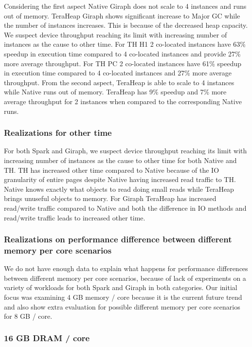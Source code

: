 Considering the first aspect Native Giraph does not scale to 4 instances and runs out of memory. TeraHeap Giraph shows significant increase to Major GC while the number of instances increases. This is because of the decreased heap capacity. We suspect device throughput reaching its limit with increasing number of instances as the cause to other time. For TH H1 2 co-located instances have 63\% speedup in execution time compared to 4 co-located instances and provide 27\% more average throughput. For TH PC 2 co-located instances have 61\% speedup in execution time compared to 4 co-located instances and 27\% more average throughput. From the second aspect, TeraHeap is able to scale to 4 instances while Native runs out of memory. TeraHeap has 9\% speedup and 7\% more average throughput for 2 instances when compared to the corresponding Native runs.

\subsubsection{Realizations for other time}
For both Spark and Giraph, we suspect device throughput reaching its limit with increasing number of instances as the cause to other time for both Native and TH. TH has increased other time compared to Native because of the IO granularity of entire pages despite Native having increased read traffic to TH. Native knows exactly what objects to read doing small reads while TeraHeap brings unuseful objects to memory. For Giraph TeraHeap has increased read/write traffic compared to Native and both the difference in IO methods and read/write traffic leads to increased other time.

\subsubsection{Realizations on performance difference between different memory per core scenarios}
We do not have enough data to explain what happens for performance differences between different memory per core scenarios, because of lack of experiments on a variety of workloads for both Spark and Giraph in both categories. Our initial focus was examining 4 GB memory / core because it is the current future trend and also show extra evaluation for possible different memory per core scenarios for 8 GB / core.

\iffalse
\subsubsection{16 GB DRAM / core}

